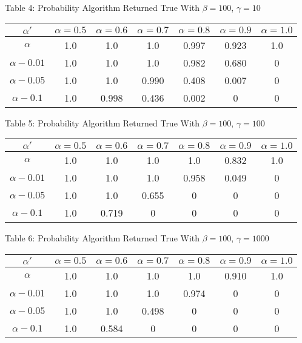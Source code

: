 \documentclass{article}
\begin{document}
\begin{center}
Table 4: Probability Algorithm Returned True With $\beta=100$, $\gamma=10$ \\
\begin{tabular}{|c|c|c|c|c|c|c|}
\hline
$\alpha'$ & $\alpha = 0.5$ & $\alpha = 0.6$ & $\alpha = 0.7$ & $\alpha = 0.8$ & $\alpha = 0.9$ & $\alpha = 1.0$ \\
\hline
$\alpha$ & 1.0 & 1.0 & 1.0 & 0.997 & 0.923 & 1.0 \\
\hline
$\alpha-0.01$ & 1.0 & 1.0 & 1.0 & 0.982 & 0.680 & 0 \\
\hline
$\alpha-0.05$ & 1.0 & 1.0 & 0.990 & 0.408 & 0.007 & 0 \\
\hline
$\alpha-0.1$ & 1.0 & 0.998 & 0.436 & 0.002 & 0 & 0 \\
\hline
\end{tabular}
\end{center}

\begin{center}
Table 5: Probability Algorithm Returned True With $\beta=100$, $\gamma=100$ \\
\begin{tabular}{|c|c|c|c|c|c|c|}
\hline
$\alpha'$ & $\alpha = 0.5$ & $\alpha = 0.6$ & $\alpha = 0.7$ & $\alpha = 0.8$ & $\alpha = 0.9$ & $\alpha = 1.0$ \\
\hline
$\alpha$ & 1.0 & 1.0 & 1.0 & 1.0 & 0.832 & 1.0 \\
\hline
$\alpha-0.01$ & 1.0 & 1.0 & 1.0 & 0.958 & 0.049 & 0 \\
\hline
$\alpha-0.05$ & 1.0 & 1.0 & 0.655 & 0 & 0 & 0 \\
\hline
$\alpha-0.1$ & 1.0 & 0.719 & 0 & 0 & 0 & 0 \\
\hline
\end{tabular}
\end{center}

\begin{center}
Table 6: Probability Algorithm Returned True With $\beta=100$, $\gamma=1000$ \\
\begin{tabular}{|c|c|c|c|c|c|c|}
\hline
$\alpha'$ & $\alpha = 0.5$ & $\alpha = 0.6$ & $\alpha = 0.7$ & $\alpha = 0.8$ & $\alpha = 0.9$ & $\alpha = 1.0$ \\
\hline
$\alpha$ & 1.0 & 1.0 & 1.0 & 1.0 & 0.910 & 1.0 \\
\hline
$\alpha-0.01$ & 1.0 & 1.0 & 1.0 & 0.974 & 0 & 0 \\
\hline
$\alpha-0.05$ & 1.0 & 1.0 & 0.498 & 0 & 0 & 0 \\
\hline
$\alpha-0.1$ & 1.0 & 0.584 & 0 & 0 & 0 & 0 \\
\hline
\end{tabular}
\end{center}
\end{document}
